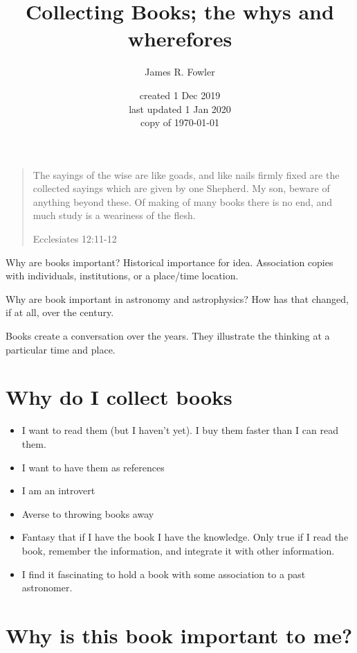 \documentclass[letterpaper]{article}
\begin{document}
\title{Collecting Books; the whys and wherefores}
\author{James R. Fowler}
\date{created 1 Dec 2019\\ last updated 1 Jan 2020\\ copy of \today}

\maketitle

\begin{quotation}
  The sayings of the wise are like goads, and like nails firmly fixed
  are the collected sayings which are given by one Shepherd.  My son,
  beware of anything beyond these. Of making of many books there is no
  end, and much study is a weariness of the flesh.

  Ecclesiates 12:11-12
\end{quotation}

Why are books important? Historical importance for idea. Association
copies with individuals, institutions, or a place/time location.

Why are book important in  astronomy and astrophysics? How
has that changed, if at all, over the century.

Books create a conversation over the years. They illustrate the thinking
at a particular time and place.

\section{Why do I collect books}

\begin{itemize}
\item I want to read them (but I haven't yet). I buy them faster than
  I can read them.
\item I want to have them as references
\item I am an introvert
\item Averse to throwing books away
\item Fantasy that if I have the book I have the knowledge. Only true
  if I read the book, remember the information, and integrate it with
  other information.
\item I find it fascinating to hold a book with some association
  to a past astronomer.
\end{itemize}


\section{Why is this book important to me?}
\end{document}
